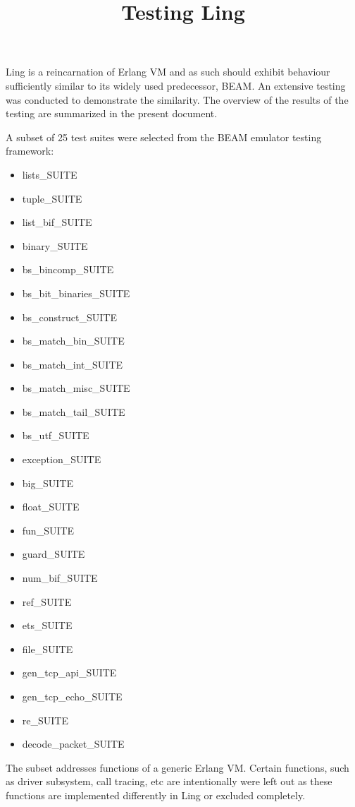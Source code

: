 \documentclass{article}
\title{Testing Ling}
\begin{document}
\maketitle

Ling is a reincarnation of Erlang VM and as such should exhibit behaviour
sufficiently similar to its widely used predecessor, BEAM. An extensive testing
was conducted to demonstrate the similarity. The overview of the results of the
testing are summarized in the present document.

A subset of 25 test suites were selected from the BEAM emulator testing
framework:
\begin{multicols}{2}
\begin{itemize}
\item lists\_SUITE
\item tuple\_SUITE
\item list\_bif\_SUITE
\item binary\_SUITE
\item bs\_bincomp\_SUITE
\item bs\_bit\_binaries\_SUITE
\item bs\_construct\_SUITE
\item bs\_match\_bin\_SUITE
\item bs\_match\_int\_SUITE
\item bs\_match\_misc\_SUITE
\item bs\_match\_tail\_SUITE
\item bs\_utf\_SUITE
\item exception\_SUITE
\item big\_SUITE
\item float\_SUITE
\item fun\_SUITE
\item guard\_SUITE
\item num\_bif\_SUITE
\item ref\_SUITE
\item ets\_SUITE
\item file\_SUITE
\item gen\_tcp\_api\_SUITE
\item gen\_tcp\_echo\_SUITE
\item re\_SUITE
\item decode\_packet\_SUITE
\end{itemize}
\end{multicols}

The subset addresses functions of a generic Erlang VM. Certain functions, such
as driver subsystem, call tracing, etc are intentionally were left out as these
functions are implemented differently in Ling or excluded completely.
\end{document}
